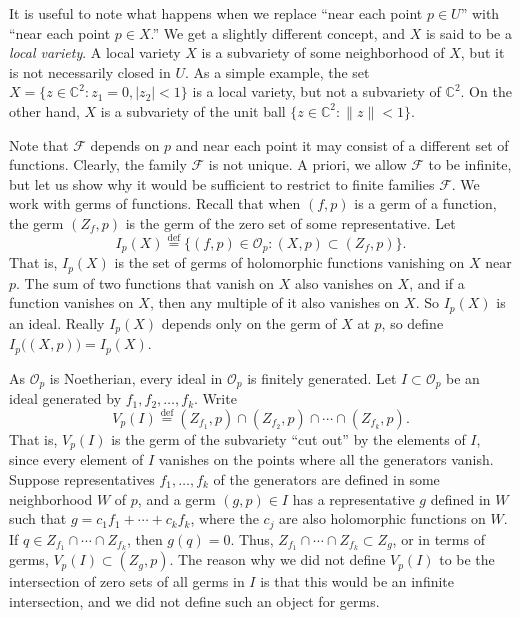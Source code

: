 \documentclass[12pt,openany]{book}
\newcommand{\snorm}[1]{\lVert {#1} \rVert}
\newcommand{\abs}[1]{\left\lvert {#1} \right\rvert}
\newcommand{\C}{{\mathbb{C}}}
\newcommand{\sF}{{\mathscr{F}}}
\newcommand{\sO}{{\mathscr{O}}}
\newcommand{\myindex}[1]{#1\index{#1}}
\theoremstyle{plain}
\theoremstyle{remark}
\theoremstyle{definition}
\theoremstyle{exercise}
\theoremstyle{example}
\begin{document}
It is useful to note what happens when
we replace ``near each point $p \in U$'' with ``near each point $p \in
X$.''  We get a slightly different concept, and $X$ is said to be a
\emph{\myindex{local variety}}.  A local variety $X$ is a subvariety of
some neighborhood of $X$, but it is not necessarily closed in $U$.  As a
simple example, the set
$X = \bigl\{ z \in \C^2 : z_1 = 0, \abs{z_2} < 1 \bigr\}$ is a
local variety, but not a subvariety of $\C^2$.  On the other hand, $X$
is a subvariety of the unit ball $\bigl\{ z \in \C^2 : \snorm{z} < 1 \bigr\}$.

Note that $\sF$ depends on $p$ and near each point it may consist of a different set of
functions.  Clearly, the family $\sF$ is not unique.  A priori, we allow $\sF$
to be infinite, but let us show why it would be sufficient
to restrict to finite families $\sF$.
We work with germs of functions.
Recall that when $(f,p)$ is a germ of a function,
the germ $(Z_f,p)$ is the germ of the zero set of some representative.
Let
%
\begin{equation*}
I_p(X) \overset{\text{def}}{=}
\bigl\{ (f,p) \in \sO_p : (X,p) \subset (Z_f,p) \bigr\} .
\end{equation*}
That is, $I_p(X)$ is the set of germs of holomorphic functions vanishing on
$X$ near $p$. 
The sum of two functions that vanish on $X$ also vanishes on $X$,
and if a function vanishes on $X$, then any multiple of it also
vanishes on $X$.  So $I_p(X)$ is an ideal.  Really $I_p(X)$ depends only on
the germ of $X$ at $p$, so define $I_p\bigl((X,p)\bigr) = I_p(X)$.

As $\sO_p$ is Noetherian, every ideal in $\sO_p$ is finitely generated.
Let $I \subset \sO_p$ be an ideal generated by $f_1,f_2,\ldots,f_k$.
Write
%
\begin{equation*}
V_p(I) \overset{\text{def}}{=}
(Z_{f_1},p) \cap (Z_{f_2},p) \cap \cdots \cap (Z_{f_k},p) .
\end{equation*}
That is, $V_p(I)$ is the germ of the subvariety ``cut out'' by the elements of $I$,
since every
element of $I$ vanishes on the points where all the generators vanish.
Suppose representatives $f_1,\ldots,f_k$ of the generators are defined
in some neighborhood $W$ of $p$,
and a germ $(g,p) \in I$ has a representative $g$ defined in $W$
such that $g = c_1 f_1 + \cdots + c_k f_k$, where the $c_j$ are also holomorphic
functions on $W$.  If $q \in Z_{f_1} \cap \cdots \cap Z_{f_k}$,
then $g(q) = 0$.  Thus,
$Z_{f_1} \cap \cdots \cap Z_{f_k} \subset Z_g$, or in terms of germs,
$V_p(I) \subset (Z_g,p)$.  The reason why we did not define $V_p(I)$ to be the
intersection of zero sets of all germs in $I$ is that this would be an
infinite intersection, and we did not define such an object for germs.
\end{document}
